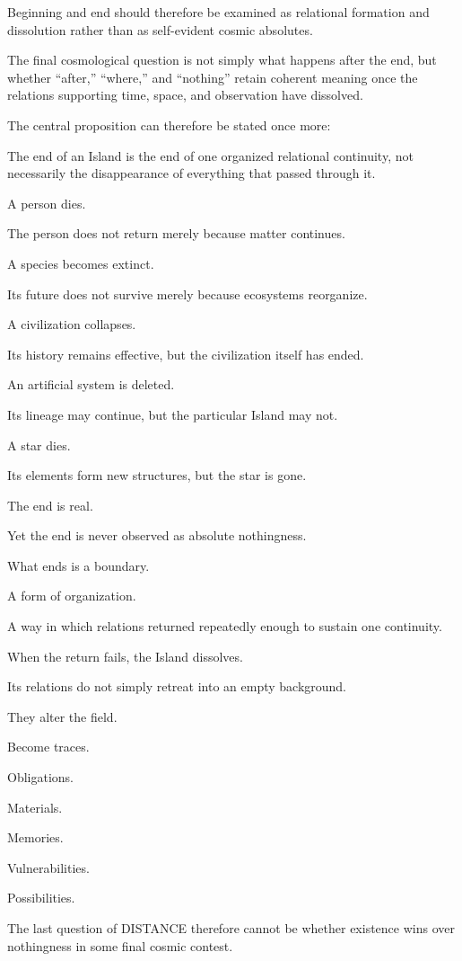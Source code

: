 Beginning and end should therefore be examined as relational formation and dissolution rather than as self-evident cosmic absolutes.

The final cosmological question is not simply what happens after the end, but whether “after,” “where,” and “nothing” retain coherent meaning once the relations supporting time, space, and observation have dissolved.

The central proposition can therefore be stated once more:

The end of an Island is the end of one organized relational continuity, not necessarily the disappearance of everything that passed through it.

A person dies.

The person does not return merely because matter continues.

A species becomes extinct.

Its future does not survive merely because ecosystems reorganize.

A civilization collapses.

Its history remains effective, but the civilization itself has ended.

An artificial system is deleted.

Its lineage may continue, but the particular Island may not.

A star dies.

Its elements form new structures, but the star is gone.

The end is real.

Yet the end is never observed as absolute nothingness.

What ends is a boundary.

A form of organization.

A way in which relations returned repeatedly enough to sustain one continuity.

When the return fails, the Island dissolves.

Its relations do not simply retreat into an empty background.

They alter the field.

Become traces.

Obligations.

Materials.

Memories.

Vulnerabilities.

Possibilities.

The last question of DISTANCE therefore cannot be whether existence wins over nothingness in some final cosmic contest.

